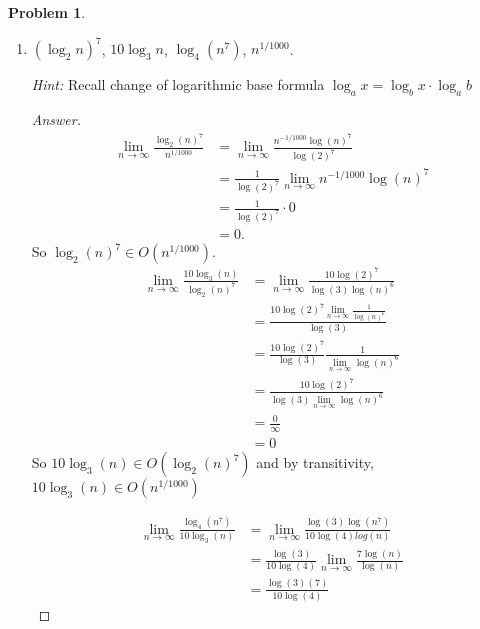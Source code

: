 \documentclass[11pt]{article}
\theoremstyle{definition}
\theoremstyle{definition}
\newtheorem{required}{Problem}
\theoremstyle{definition}
\begin{document}
\begin{required}
\begin{enumerate} [label=(\alph*)]
\begin{proof}
 \begin{itemize}
 	\item This function grows the slowest: $100n+100$
 	\item These functions grow at the same asymptotic rate and faster than $100n + 100$: $n^2+2n, \frac{n^2}{\sqrt{n}}$
 	\item This function grows faster than $n^2+2n$: $n^3-10n^2$.
 \end{itemize}
    \end{proof}
        
    \newpage
\subsection{Problem 1\ref{1b} (2 points)}
    \item \label{1b} $ (\log_2 n)^7 $, \qquad $10 \log_3 n$, \qquad $\log_4 (n^7)$, \qquad $n^{1/1000}$.
    
    \emph{Hint:} Recall change of logarithmic base formula $\log_a x = \log_b x\cdot\log_a b$
    \begin{proof}[Answer]
    \begin{align*}
	\lim_{n \to \infty} \frac{\log_{2}(n)^7}{n^{1/1000}} &= \lim_{n \to \infty} \frac{n^{-1/1000} \log(n)^7}{\log(2)^7}\\
	&= \frac{1}{\log(2)^7} \lim_{n \to \infty} n^{-1/1000} \log(n)^7\\
	&= \frac{1}{\log(2)^7} \cdot 0\\
	&= 0.
	\end{align*}
So $\log_{2}(n)^7 \in O(n^{1/1000})$.\\

	\begin{align*}
		\lim_{n \to \infty}\frac{10\log_{3}(n)}{\log_{2}(n)^7} &= \lim_{n \to \infty} \frac{10\log(2)^7}{\log(3)\log(n)^6}\\
		&= \frac{10\log(2)^7 \lim_{n \to \infty} \frac{1}{\log(n)^6}}{\log(3)}\\
		&= \frac{10\log(2)^7}{\log(3)} \frac{1}{\lim_{n \to \infty}\log(n)^6}\\
		&= \frac{10\log(2)^7}{\log(3)\lim_{n \to \infty}\log(n)^6}\\
		&= \frac{0}{\infty}\\
		&= 0
	\end{align*}
So $10\log_{3}(n) \in O(\log_{2}(n)^7)$ and by transitivity, $10\log_{3}(n) \in O(n^{1/1000})$

\begin{align*}
	\lim_{n \to \infty}\frac{\log_{4}(n^7)}{10\log_{3}(n)} &= \lim_{n \to \infty}\frac{\log(3)\log(n^7)}{10\log(4)log(n)}\\
	&= \frac{\log(3)}{10\log(4)} \lim_{n \to \infty}\frac{7\log(n)}{\log(n)}\\
	&= \frac{\log(3)(7)}{10\log(4)}
\end{align*}


\end{proof}
\end{enumerate}
\end{required}
\end{document}
